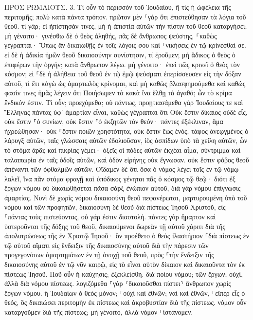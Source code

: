 \documentclass[twoside, 9pt]{extreport}
\begin{document}
ΠΡΟΣ ΡΩΜΑΙΟΥΣ.
3.
Τί οὖν τὸ περισσὸν τοῦ Ἰουδαίου, ἢ τίς ἡ ὠφέλεια τῆς περιτομῆς; 
πολὺ κατὰ πάντα τρόπον. πρῶτον μὲν ⸀γὰρ ὅτι ἐπιστεύθησαν τὰ λόγια τοῦ θεοῦ. 
τί γάρ; εἰ ἠπίστησάν τινες, μὴ ἡ ἀπιστία αὐτῶν τὴν πίστιν τοῦ θεοῦ καταργήσει; 
μὴ γένοιτο· γινέσθω δὲ ὁ θεὸς ἀληθής, πᾶς δὲ ἄνθρωπος ψεύστης, ⸀καθὼς γέγραπται· Ὅπως ἂν δικαιωθῇς ἐν τοῖς λόγοις σου καὶ ⸀νικήσεις ἐν τῷ κρίνεσθαί σε. 
εἰ δὲ ἡ ἀδικία ἡμῶν θεοῦ δικαιοσύνην συνίστησιν, τί ἐροῦμεν; μὴ ἄδικος ὁ θεὸς ὁ ἐπιφέρων τὴν ὀργήν; κατὰ ἄνθρωπον λέγω. 
μὴ γένοιτο· ἐπεὶ πῶς κρινεῖ ὁ θεὸς τὸν κόσμον; 
εἰ ⸀δὲ ἡ ἀλήθεια τοῦ θεοῦ ἐν τῷ ἐμῷ ψεύσματι ἐπερίσσευσεν εἰς τὴν δόξαν αὐτοῦ, τί ἔτι κἀγὼ ὡς ἁμαρτωλὸς κρίνομαι, 
καὶ μὴ καθὼς βλασφημούμεθα καὶ καθώς φασίν τινες ἡμᾶς λέγειν ὅτι Ποιήσωμεν τὰ κακὰ ἵνα ἔλθῃ τὰ ἀγαθά; ὧν τὸ κρίμα ἔνδικόν ἐστιν. 
Τί οὖν; προεχόμεθα; οὐ πάντως, προῃτιασάμεθα γὰρ Ἰουδαίους τε καὶ Ἕλληνας πάντας ὑφ᾽ ἁμαρτίαν εἶναι, 
καθὼς γέγραπται ὅτι Οὐκ ἔστιν δίκαιος οὐδὲ εἷς, 
οὐκ ἔστιν ⸀ὁ συνίων, οὐκ ἔστιν ⸁ὁ ἐκζητῶν τὸν θεόν· 
πάντες ἐξέκλιναν, ἅμα ἠχρεώθησαν· οὐκ ⸀ἔστιν ποιῶν χρηστότητα, οὐκ ἔστιν ἕως ἑνός. 
τάφος ἀνεῳγμένος ὁ λάρυγξ αὐτῶν, ταῖς γλώσσαις αὐτῶν ἐδολιοῦσαν, ἰὸς ἀσπίδων ὑπὸ τὰ χείλη αὐτῶν, 
ὧν τὸ στόμα ἀρᾶς καὶ πικρίας γέμει· 
ὀξεῖς οἱ πόδες αὐτῶν ἐκχέαι αἷμα, 
σύντριμμα καὶ ταλαιπωρία ἐν ταῖς ὁδοῖς αὐτῶν, 
καὶ ὁδὸν εἰρήνης οὐκ ἔγνωσαν. 
οὐκ ἔστιν φόβος θεοῦ ἀπέναντι τῶν ὀφθαλμῶν αὐτῶν. 
Οἴδαμεν δὲ ὅτι ὅσα ὁ νόμος λέγει τοῖς ἐν τῷ νόμῳ λαλεῖ, ἵνα πᾶν στόμα φραγῇ καὶ ὑπόδικος γένηται πᾶς ὁ κόσμος τῷ θεῷ· 
διότι ἐξ ἔργων νόμου οὐ δικαιωθήσεται πᾶσα σὰρξ ἐνώπιον αὐτοῦ, διὰ γὰρ νόμου ἐπίγνωσις ἁμαρτίας. 
Νυνὶ δὲ χωρὶς νόμου δικαιοσύνη θεοῦ πεφανέρωται, μαρτυρουμένη ὑπὸ τοῦ νόμου καὶ τῶν προφητῶν, 
δικαιοσύνη δὲ θεοῦ διὰ πίστεως Ἰησοῦ Χριστοῦ, εἰς ⸀πάντας τοὺς πιστεύοντας, οὐ γάρ ἐστιν διαστολή. 
πάντες γὰρ ἥμαρτον καὶ ὑστεροῦνται τῆς δόξης τοῦ θεοῦ, 
δικαιούμενοι δωρεὰν τῇ αὐτοῦ χάριτι διὰ τῆς ἀπολυτρώσεως τῆς ἐν Χριστῷ Ἰησοῦ· 
ὃν προέθετο ὁ θεὸς ἱλαστήριον ⸀διὰ πίστεως ἐν τῷ αὐτοῦ αἵματι εἰς ἔνδειξιν τῆς δικαιοσύνης αὐτοῦ διὰ τὴν πάρεσιν τῶν προγεγονότων ἁμαρτημάτων 
ἐν τῇ ἀνοχῇ τοῦ θεοῦ, πρὸς ⸀τὴν ἔνδειξιν τῆς δικαιοσύνης αὐτοῦ ἐν τῷ νῦν καιρῷ, εἰς τὸ εἶναι αὐτὸν δίκαιον καὶ δικαιοῦντα τὸν ἐκ πίστεως Ἰησοῦ. 
Ποῦ οὖν ἡ καύχησις; ἐξεκλείσθη. διὰ ποίου νόμου; τῶν ἔργων; οὐχί, ἀλλὰ διὰ νόμου πίστεως. 
λογιζόμεθα ⸀γὰρ ⸂δικαιοῦσθαι πίστει⸃ ἄνθρωπον χωρὶς ἔργων νόμου. 
ἢ Ἰουδαίων ὁ θεὸς μόνον; ⸀οὐχὶ καὶ ἐθνῶν; ναὶ καὶ ἐθνῶν, 
⸀εἴπερ εἷς ὁ θεός, ὃς δικαιώσει περιτομὴν ἐκ πίστεως καὶ ἀκροβυστίαν διὰ τῆς πίστεως. 
νόμον οὖν καταργοῦμεν διὰ τῆς πίστεως; μὴ γένοιτο, ἀλλὰ νόμον ⸀ἱστάνομεν. 
\end{document}
